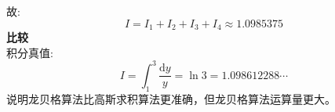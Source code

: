 \documentclass[a4paper]{article}
\begin{document}
\begin{enumerate}
\begin{equation}
    \end{equation}
    故:
    \begin{equation}
        I=I_{1}+I_{2}+I_{3}+I_{4} \approx 1.0985375
    \end{equation}
    \textbf{比较} \\
    积分真值:
    \begin{equation}
        I=\int_{1}^{3} \frac{\mathrm{d} y}{y}=\ln 3=1.098612288 \cdots
    \end{equation}
    说明龙贝格算法比高斯求积算法更准确，但龙贝格算法运算量更大。
\end{enumerate}
\end{document}
